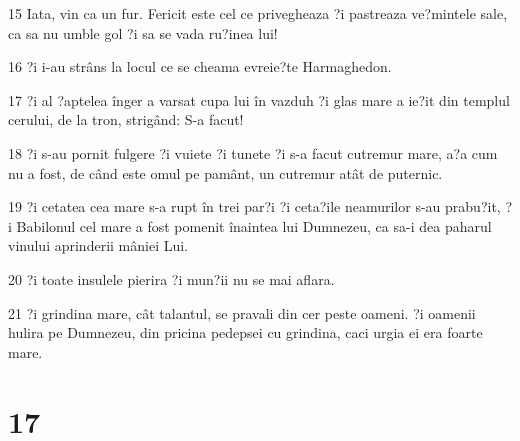 \par 15 Iata, vin ca un fur. Fericit este cel ce privegheaza ?i pastreaza ve?mintele sale, ca sa nu umble gol ?i sa se vada ru?inea lui!
\par 16 ?i i-au strâns la locul ce se cheama evreie?te Harmaghedon.
\par 17 ?i al ?aptelea înger a varsat cupa lui în vazduh ?i glas mare a ie?it din templul cerului, de la tron, strigând: S-a facut!
\par 18 ?i s-au pornit fulgere ?i vuiete ?i tunete ?i s-a facut cutremur mare, a?a cum nu a fost, de când este omul pe pamânt, un cutremur atât de puternic.
\par 19 ?i cetatea cea mare s-a rupt în trei par?i ?i ceta?ile neamurilor s-au prabu?it, ?i Babilonul cel mare a fost pomenit înaintea lui Dumnezeu, ca sa-i dea paharul vinului aprinderii mâniei Lui.
\par 20 ?i toate insulele pierira ?i mun?ii nu se mai aflara.
\par 21 ?i grindina mare, cât talantul, se pravali din cer peste oameni. ?i oamenii hulira pe Dumnezeu, din pricina pedepsei cu grindina, caci urgia ei era foarte mare.

\chapter{17}

